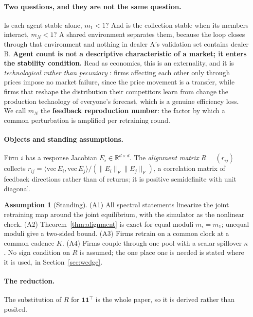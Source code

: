 \documentclass{article}
\theoremstyle{plain}
\theoremstyle{definition}
\newtheorem{assumption}{Assumption}
\newcommand{\mN}{m_N}
\begin{document}
\paragraph{Two questions, and they are not the same question.}
Is each agent stable alone, $m_1 < 1$? And is the collection stable when its members interact, $\mN < 1$? A shared environment separates them, because the loop closes through that environment and nothing in dealer A's validation set contains dealer B. \textbf{Agent count is not a descriptive characteristic of a market; it enters the stability condition.} Read as economics, this is an externality, and it is \emph{technological rather than pecuniary} \citep{buchanan1962}: firms affecting each other only through prices impose no market failure, since the price movement is a transfer, while firms that reshape the distribution their competitors learn from change the production technology of everyone's forecast, which is a genuine efficiency loss. We call $\mN$ the \textbf{feedback reproduction number}: the factor by which a common perturbation is amplified per retraining round.

\paragraph{Objects and standing assumptions.}
Firm $i$ has a response Jacobian $E_i \in \mathbb{R}^{d\times d}$. The \emph{alignment matrix} $R = (r_{ij})$ collects $r_{ij} = \langle \mathrm{vec}\,E_i, \mathrm{vec}\,E_j\rangle / (\|E_i\|_F \|E_j\|_F)$, a correlation matrix of feedback directions rather than of returns; it is positive semidefinite with unit diagonal.

\begin{assumption}[Standing]
\label{ass:standing}
(A1) All spectral statements linearize the joint retraining map around the joint equilibrium, with the simulator as the nonlinear check. (A2) Theorem~\ref{thm:alignment} is exact for equal moduli $m_i = m_1$; unequal moduli give a two-sided bound. (A3) Firms retrain on a common clock at a common cadence $K$. (A4) Firms couple through one pool with a scalar spillover $\kappa$. No sign condition on $R$ is assumed; the one place one is needed is stated where it is used, in Section~\ref{sec:wedge}.
\end{assumption}

\paragraph{The reduction.}
The substitution of $R$ for $\mathbf{1}\mathbf{1}^{\top}$ is the whole paper, so it is derived rather than posited.
\end{document}
